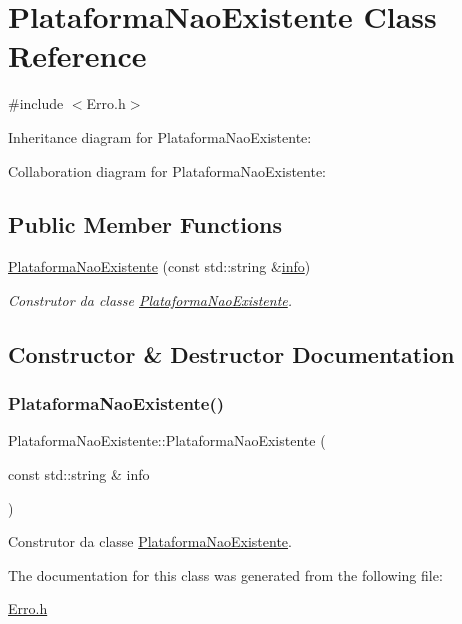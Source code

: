\hypertarget{class_plataforma_nao_existente}{}\section{Plataforma\+Nao\+Existente Class Reference}
\label{class_plataforma_nao_existente}


{\ttfamily \#include $<$Erro.\+h$>$}



Inheritance diagram for Plataforma\+Nao\+Existente\+:


Collaboration diagram for Plataforma\+Nao\+Existente\+:
\subsection*{Public Member Functions}
\begin{DoxyCompactItemize}
\item 
\mbox{\hyperlink{class_plataforma_nao_existente_ada0f9e32fe5f64550905ce8e35e8ab34}{Plataforma\+Nao\+Existente}} (const std\+::string \&\mbox{\hyperlink{class_erro_a3ecaaf6f8e15a0830a648035b456cb62}{info}})
\begin{DoxyCompactList}\small\item\em Construtor da classe \mbox{\hyperlink{class_plataforma_nao_existente}{Plataforma\+Nao\+Existente}}. \end{DoxyCompactList}\end{DoxyCompactItemize}


\subsection{Constructor \& Destructor Documentation}
\mbox{\label{class_plataforma_nao_existente_ada0f9e32fe5f64550905ce8e35e8ab34}} 
\subsubsection{\texorpdfstring{Plataforma\+Nao\+Existente()}{PlataformaNaoExistente()}}
{\footnotesize\ttfamily Plataforma\+Nao\+Existente\+::\+Plataforma\+Nao\+Existente (\begin{DoxyParamCaption}\item[{const std\+::string \&}]{info }\end{DoxyParamCaption})\hspace{0.3cm}{\ttfamily [inline]}}



Construtor da classe \mbox{\hyperlink{class_plataforma_nao_existente}{Plataforma\+Nao\+Existente}}. 



The documentation for this class was generated from the following file\+:\begin{DoxyCompactItemize}
\item 
\mbox{\hyperlink{_erro_8h}{Erro.\+h}}\end{DoxyCompactItemize}
